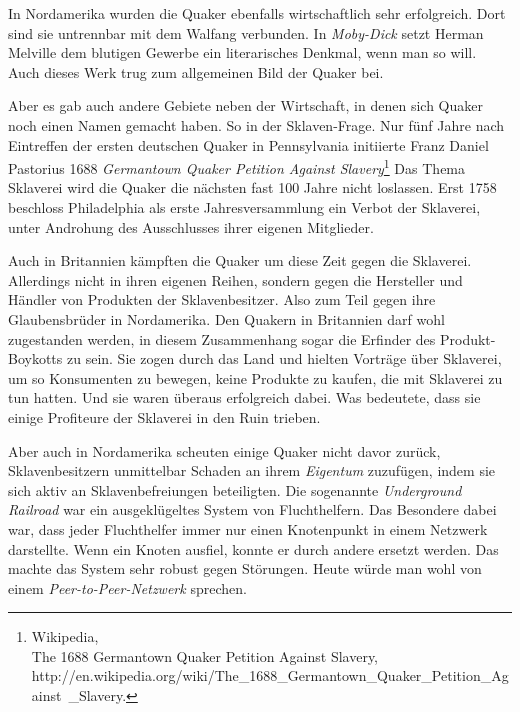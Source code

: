 \medskip

In Nordamerika wurden die Quaker ebenfalls wirtschaftlich sehr erfolgreich. Dort
sind sie untrennbar mit dem Walfang verbunden. In
\textit{Moby-Dick} setzt
Herman Melville dem blutigen Gewerbe ein
literarisches Denkmal, wenn man so
will. Auch dieses Werk trug zum allgemeinen Bild der Quaker bei.

\medskip

Aber es gab auch andere Gebiete neben der Wirtschaft, in denen sich Quaker noch
einen
Namen gemacht haben. So in der Sklaven-Frage. Nur fünf Jahre
nach Eintreffen
der ersten deutschen Quaker in Pennsylvania initiierte Franz Daniel Pastorius
1688 \textit{Germantown Quaker Petition Against Slavery}\footnote{Wikipedia,
\\The 1688 Germantown Quaker Petition Against Slavery,
\\http://en.wikipedia.org/wiki/The\_1688\_Germantown\_Quaker\_Petition\_Against\
\_Slavery.} Das Thema Sklaverei wird die Quaker die nächsten fast 100 Jahre
nicht
loslassen. Erst 1758 beschloss Philadelphia als erste
Jahresversammlung ein Verbot der Sklaverei,
unter Androhung des Ausschlusses ihrer eigenen Mitglieder.

\medskip

Auch in Britannien kämpften die Quaker um diese Zeit gegen die Sklaverei.
Allerdings nicht in ihren eigenen Reihen, sondern gegen die Hersteller
und Händler von Produkten der Sklavenbesitzer. Also zum Teil gegen ihre
Glaubensbrüder in Nordamerika. Den Quakern in Britannien darf wohl zugestanden
werden, in diesem Zusammenhang sogar die Erfinder des Produkt-Boykotts zu sein.
Sie zogen durch das Land und hielten Vorträge über Sklaverei, um so Konsumenten
zu
bewegen, keine Produkte zu kaufen, die mit Sklaverei zu tun hatten. Und sie
waren überaus erfolgreich dabei. Was bedeutete, dass sie einige Profiteure der
Sklaverei in den Ruin trieben.

\medskip

Aber auch in Nordamerika scheuten einige Quaker nicht
davor zurück,
Sklavenbesitzern unmittelbar Schaden an ihrem \textit{Eigentum} zuzufügen, indem
sie sich
aktiv an Sklavenbefreiungen beteiligten. Die sogenannte
\textit{Underground Railroad} war ein
ausgeklügeltes System von Fluchthelfern. Das
Besondere dabei war, dass jeder Fluchthelfer
immer
nur einen Knotenpunkt in einem
Netzwerk darstellte. Wenn ein Knoten ausfiel, konnte er durch andere ersetzt
werden. Das machte das System sehr robust gegen Störungen. Heute würde man
wohl
von einem \textit{Peer-to-Peer-Netzwerk} sprechen.


